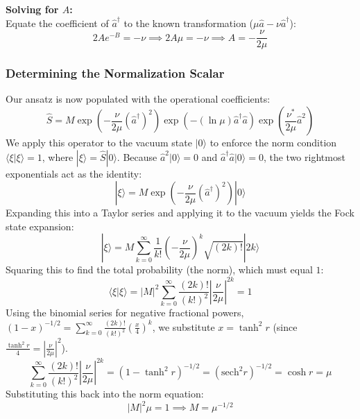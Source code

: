{\textbf{Solving for $A$:} \\
Equate the coefficient of $\hat{a}^\dagger$ to the known transformation ($\mu\hat{a} - \nu\hat{a}^\dagger$):
\begin{equation*}
2Ae^{-B} = -\nu \implies 2A\mu = -\nu \implies A = -\frac{\nu}{2\mu}
\end{equation*}

\subsubsection{Determining the Normalization Scalar}
Our ansatz is now populated with the operational coefficients:
\begin{equation*}
\hat{S} = M \exp\left(-\frac{\nu}{2\mu}(\hat{a}^\dagger)^2\right) \exp\left(-(\ln\mu)\hat{a}^\dagger\hat{a}\right) \exp\left(\frac{\nu^*}{2\mu}\hat{a}^2\right)
\end{equation*}
We apply this operator to the vacuum state $|0\rangle$ to enforce the norm condition $\langle \xi | \xi \rangle = 1$, where $|\xi\rangle = \hat{S}|0\rangle$. Because $\hat{a}^2|0\rangle = 0$ and $\hat{a}^\dagger\hat{a}|0\rangle = 0$, the two rightmost exponentials act as the identity:
\begin{equation*}
|\xi\rangle = M \exp\left(-\frac{\nu}{2\mu}(\hat{a}^\dagger)^2\right)|0\rangle
\end{equation*}
Expanding this into a Taylor series and applying it to the vacuum yields the Fock state expansion:
\begin{equation*}
|\xi\rangle = M \sum_{k=0}^{\infty} \frac{1}{k!} \left(-\frac{\nu}{2\mu}\right)^k \sqrt{(2k)!} |2k\rangle
\end{equation*}
Squaring this to find the total probability (the norm), which must equal $1$:
\begin{equation*}
\langle \xi | \xi \rangle = |M|^2 \sum_{k=0}^{\infty} \frac{(2k)!}{(k!)^2} \left|\frac{\nu}{2\mu}\right|^{2k} = 1
\end{equation*}
Using the binomial series for negative fractional powers, $(1 - x)^{-1/2} = \sum_{k=0}^{\infty} \frac{(2k)!}{(k!)^2} \left(\frac{x}{4}\right)^k$, we substitute $x = \tanh^2 r$ (since $\frac{\tanh^2 r}{4} = \left|\frac{\nu}{2\mu}\right|^2$).
\begin{equation*}
\sum_{k=0}^{\infty} \frac{(2k)!}{(k!)^2} \left|\frac{\nu}{2\mu}\right|^{2k} = (1 - \tanh^2 r)^{-1/2} = (\text{sech}^2 r)^{-1/2} = \cosh r = \mu
\end{equation*}
Substituting this back into the norm equation:
\begin{equation*}
|M|^2 \mu = 1 \implies M = \mu^{-1/2}
\end{equation*}

}
